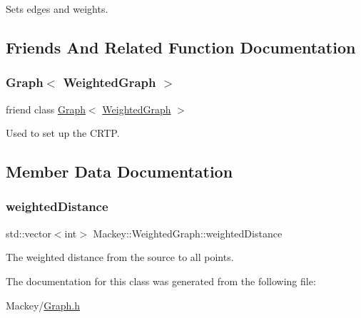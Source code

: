Sets edges and weights. 



\subsection{Friends And Related Function Documentation}
\mbox{\label{classMackey_1_1WeightedGraph_aa4863e14b8d7dcd76942894cae55e453}} 
\subsubsection{\texorpdfstring{Graph$<$ Weighted\+Graph $>$}{Graph< WeightedGraph >}}
{\footnotesize\ttfamily friend class \hyperlink{classMackey_1_1Graph}{Graph}$<$ \hyperlink{classMackey_1_1WeightedGraph}{Weighted\+Graph} $>$\hspace{0.3cm}{\ttfamily [friend]}}



Used to set up the C\+R\+TP. 



\subsection{Member Data Documentation}
\mbox{\label{classMackey_1_1WeightedGraph_a72a46f1710e7783a4b0ac64468036a90}} 
\subsubsection{\texorpdfstring{weighted\+Distance}{weightedDistance}}
{\footnotesize\ttfamily std\+::vector$<$int$>$ Mackey\+::\+Weighted\+Graph\+::weighted\+Distance}



The weighted distance from the source to all points. 



The documentation for this class was generated from the following file\+:\begin{DoxyCompactItemize}
\item 
Mackey/\hyperlink{Graph_8h}{Graph.\+h}\end{DoxyCompactItemize}
